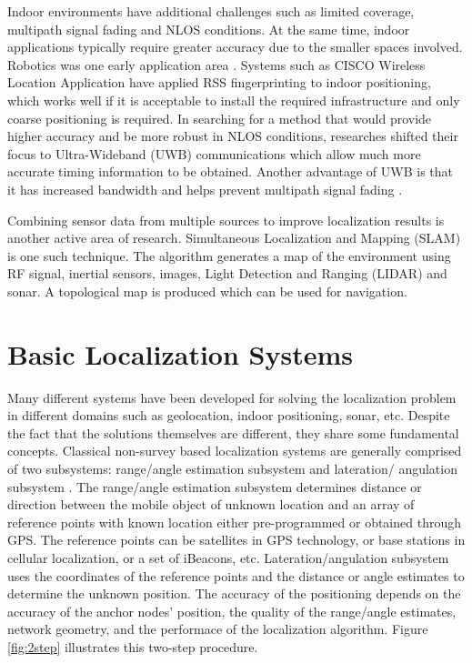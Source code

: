 Indoor environments have additional challenges such as limited coverage, multipath signal fading and NLOS conditions. At the same time, indoor applications typically require greater accuracy due to the smaller spaces involved. Robotics was one early application area \cite{Durant}. Systems such as CISCO Wireless Location Application \cite{CiscoWLA} have applied RSS fingerprinting to indoor positioning, which works well if it is acceptable to install the required infrastructure and only coarse positioning is required. In searching for a method that would provide higher accuracy and be more robust in NLOS conditions, researches shifted their focus to Ultra-Wideband (UWB) communications which allow much more accurate timing information to be obtained. Another advantage of UWB is that it has increased bandwidth and helps prevent multipath signal fading \cite{AlaviUWB}.

Combining sensor data from multiple sources to improve localization results is another active area of research. Simultaneous Localization and Mapping (SLAM) is one such technique. The algorithm generates a map of the environment using RF signal, inertial sensors, images, Light Detection and Ranging (LIDAR) and sonar. A topological map is produced which can be used for navigation.



\section{Basic Localization Systems}

Many different systems have been developed for solving the localization problem in different domains such as geolocation, indoor positioning, sonar, etc. Despite the fact that the  solutions themselves are different, they share some fundamental concepts. Classical non-survey based localization systems  are generally comprised of two subsystems: range/angle estimation subsystem and lateration/
angulation subsystem \cite{GeoLoc}. The range/angle estimation subsystem determines distance or direction between the  mobile object of unknown location  and an array of reference points with known location  either pre-programmed or obtained through GPS.  The reference points can be satellites in GPS technology, or base stations in cellular localization, or a set of iBeacons, etc. Lateration/angulation subsystem uses the coordinates of the reference points and the distance or angle estimates to determine the unknown position.  The accuracy of the positioning depends on the accuracy of the anchor nodes’ position, the quality of the range/angle estimates, network geometry, and the performace of the localization algorithm. Figure \ref{fig:2step} illustrates this two-step procedure.


